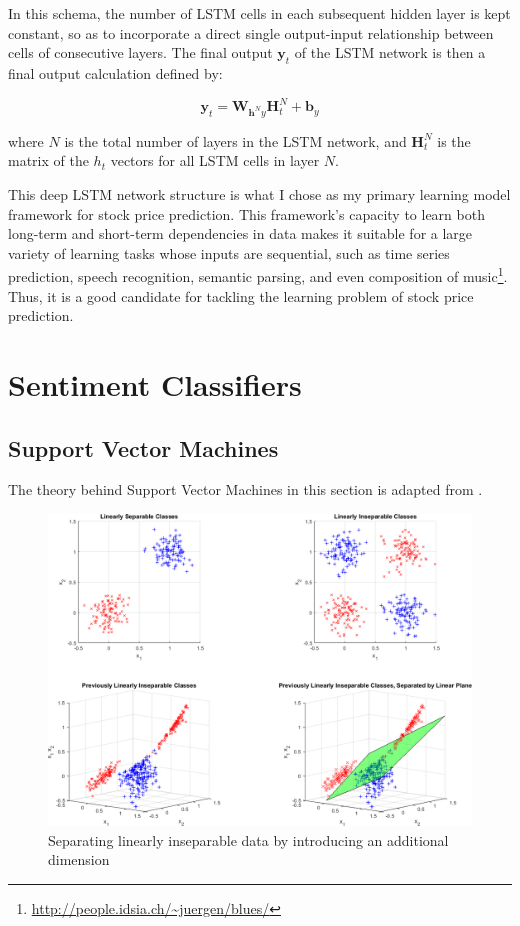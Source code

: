 \documentclass[12pt,a4paper,twoside,openright]{report}
\renewcommand{\vec}[1]{\mathbf{#1}}
\begin{document}
In this schema, the number of LSTM cells in each subsequent hidden layer is kept constant,
so as to incorporate a direct single output-input relationship between cells of consecutive layers.
The final output $\vec{y}_t$ of the LSTM network is then a final output calculation defined by:

\begin{equation}
	\vec{y}_t = \vec{W}_{\vec{h}^Ny}\vec{H}_t^N + \vec{b}_y
\end{equation}

where $N$ is the total number of layers in the LSTM network, and $\vec{H}_t^N$ is the matrix
of the $h_t$ vectors for all LSTM cells in layer $N$.

This deep LSTM network structure is what I chose as my primary learning model
framework for stock price prediction. This framework's capacity to learn
both long-term and short-term dependencies in data makes it suitable for a large
variety of learning tasks whose inputs are sequential, such as time series prediction,
speech recognition, semantic parsing, and even composition of music\footnote{\url{http://people.idsia.ch/~juergen/blues/}}. 
Thus, it is a good candidate for tackling the learning problem of stock price prediction.

\section{Sentiment Classifiers}

\subsection{Support Vector Machines}
\label{sec:introSVM}

The theory behind Support Vector Machines in this section is adapted from
\cite{Holden18}.

\begin{figure}[h]
	\includegraphics[width=\textwidth]{SVMDataCrop.png}
	\caption[Example of the kernel trick]{Separating linearly inseparable data by introducing an additional dimension\footnotemark}
	\label{fig:SVMSep}
\end{figure}
\end{document}
